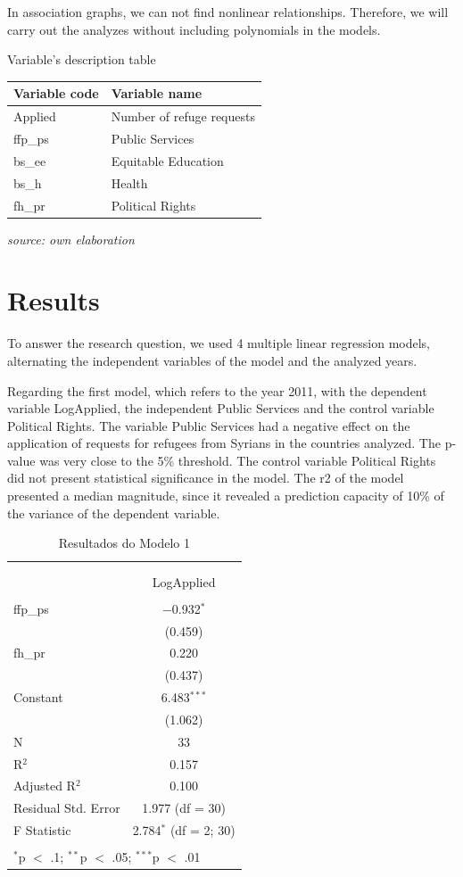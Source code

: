 \documentclass[]{elsarticle} %
\begin{document}
In association graphs, we can not find nonlinear relationships.
Therefore, we will carry out the analyzes without including polynomials
in the models.

Variable's description table

\begin{longtable}[]{@{}ll@{}}
\toprule
Variable code & Variable name\tabularnewline
\midrule
\endhead
Applied & Number of refuge requests\tabularnewline
ffp\_ps & Public Services\tabularnewline
bs\_ee & Equitable Education\tabularnewline
bs\_h & Health\tabularnewline
fh\_pr & Political Rights\tabularnewline
\bottomrule
\end{longtable}

\emph{source: own elaboration}

\section{Results}\label{results}

To answer the research question, we used 4 multiple linear regression
models, alternating the independent variables of the model and the
analyzed years.

Regarding the first model, which refers to the year 2011, with the
dependent variable LogApplied, the independent Public Services and the
control variable Political Rights. The variable Public Services had a
negative effect on the application of requests for refugees from Syrians
in the countries analyzed. The p-value was very close to the 5\%
threshold. The control variable Political Rights did not present
statistical significance in the model. The r2 of the model presented a
median magnitude, since it revealed a prediction capacity of 10\% of the
variance of the dependent variable.

\begin{table}[!htbp] \centering 
  \caption{Resultados do Modelo 1} 
  \label{} 
\begin{tabular}{@{\extracolsep{5pt}}lc} 
\\[-1.8ex]\hline \\[-1.8ex] 
\\[-1.8ex] & LogApplied \\ 
\hline \\[-1.8ex] 
 ffp\_ps & $-$0.932$^{*}$ \\ 
  & (0.459) \\ 
  fh\_pr & 0.220 \\ 
  & (0.437) \\ 
  Constant & 6.483$^{***}$ \\ 
  & (1.062) \\ 
 N & 33 \\ 
R$^{2}$ & 0.157 \\ 
Adjusted R$^{2}$ & 0.100 \\ 
Residual Std. Error & 1.977 (df = 30) \\ 
F Statistic & 2.784$^{*}$ (df = 2; 30) \\ 
\hline \\[-1.8ex] 
\multicolumn{2}{l}{$^{*}$p $<$ .1; $^{**}$p $<$ .05; $^{***}$p $<$ .01} \\ 
\end{tabular} 
\end{table}
\end{document}
